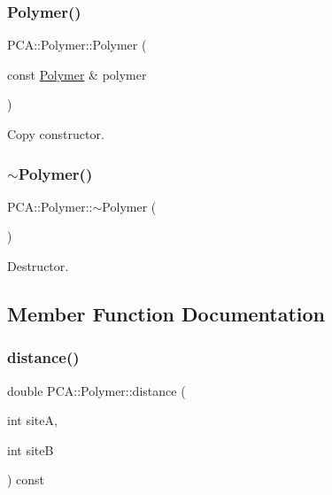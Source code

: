 \subsubsection{\texorpdfstring{Polymer()}{Polymer()}\hspace{0.1cm}{\footnotesize\ttfamily [3/3]}}
{\footnotesize\ttfamily P\+C\+A\+::\+Polymer\+::\+Polymer (\begin{DoxyParamCaption}\item[{const \hyperlink{class_p_c_a_1_1_polymer}{Polymer} \&}]{polymer }\end{DoxyParamCaption})}



Copy constructor. 

\hypertarget{class_p_c_a_1_1_polymer_ac0d31fa5c6bee720f8069805d6669606}{}\label{class_p_c_a_1_1_polymer_ac0d31fa5c6bee720f8069805d6669606} 
\subsubsection{\texorpdfstring{$\sim$\+Polymer()}{~Polymer()}}
{\footnotesize\ttfamily P\+C\+A\+::\+Polymer\+::$\sim$\+Polymer (\begin{DoxyParamCaption}{ }\end{DoxyParamCaption})}



Destructor. 



\subsection{Member Function Documentation}
\hypertarget{class_p_c_a_1_1_polymer_a901d8c030d3edb333498edcc4502b27a}{}\label{class_p_c_a_1_1_polymer_a901d8c030d3edb333498edcc4502b27a} 
\subsubsection{\texorpdfstring{distance()}{distance()}}
{\footnotesize\ttfamily double P\+C\+A\+::\+Polymer\+::distance (\begin{DoxyParamCaption}\item[{int}]{siteA,  }\item[{int}]{siteB }\end{DoxyParamCaption}) const}

